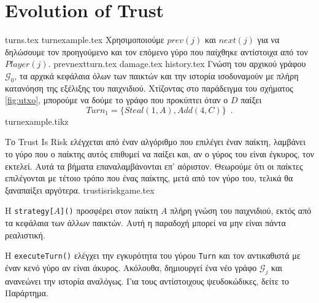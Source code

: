 \section{Evolution of Trust}
  {turns.tex}
  {turnexample.tex}
  Χρησιμοποιούμε $prev\left(j\right)$ και $next\left(j\right)$ για να δηλώσουμε τον προηγούμενο και τον επόμενο γύρο που
  παίχθηκε αντίστοιχα από τον $Player\left(j\right)$.
  {prevnextturn.tex}
  {damage.tex}
  {history.tex}
  Γνώση του αρχικού γράφου $\mathcal{G}_0$, τα αρχικά κεφάλαια όλων των παικτών και την ιστορία ισοδυναμούν με πλήρη κατανόηση
  της εξέλιξης του παιχνιδιού. Χτίζοντας στο παράδειγμα του σχήματος \ref{fig:utxo}, μπορούμε να δούμε το γράφο που προκύπτει
  όταν ο $D$ παίξει
  \begin{equation}
  \label{turnexample}
     Turn_1 = \{Steal\left(1, A\right), Add\left(4, C\right)\} \enspace.
  \end{equation}
  {turnexample.tikz}

  Το \textlatin{Trust Is Risk} ελέγχεται από έναν αλγόριθμο που επιλέγει έναν παίκτη, λαμβάνει το γύρο που ο παίκτης αυτός
  επιθυμεί να παίξει και, αν ο γύρος του είναι έγκυρος, τον εκτελεί. Αυτά τα βήματα επαναλαμβάνονται επ' αόριστον. Θεωρούμε
  ότι οι παίκτες επιλέγονται με τέτοιο τρόπο που ένας παίκτης, μετά από τον γύρο του, τελικά θα ξαναπαίξει αργότερα.
  {trustisriskgame.tex}

  Η \textlatin{\texttt{strategy[}$A$\texttt{]()}} προσφέρει στον παίκτη $A$ πλήρη γνώση του παιχνιδιού, εκτός από τα κεφάλαια των άλλων
  παικτών. Αυτή η παραδοχή μπορεί να μην είναι πάντα ρεαλιστική.

  Η \textlatin{\texttt{executeTurn()}} ελέγχει την εγκυρότητα του γύρου \texttt{Turn} και τον αντικαθιστά με έναν κενό γύρο αν είναι
  άκυρος. Ακόλουθα, δημιουργεί ένα νέο γράφο $\mathcal{G}_j$ και ανανεώνει την ιστορία αναλόγως. Για τους αντίστοιχους
  ψευδοκώδικες, δείτε το Παράρτημα.
